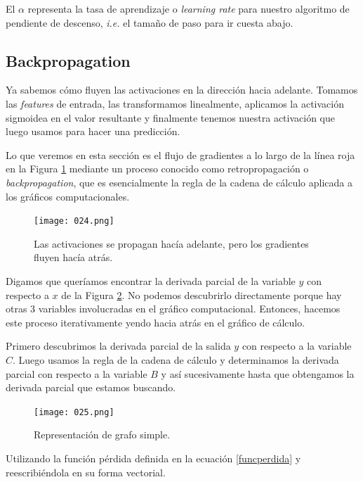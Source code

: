 \documentclass[14.5pt,a4paper]{article}
\begin{document}
El $\alpha$ representa la tasa de aprendizaje o  \textit{learning rate} para nuestro algoritmo de pendiente de descenso, \textit{i.e.}  el tamaño de paso para ir cuesta abajo.

\subsection{Backpropagation}

Ya sabemos cómo fluyen las activaciones en la dirección hacia adelante. Tomamos las \textit{features} de entrada, las transformamos linealmente, aplicamos la activación sigmoidea en el valor resultante y finalmente tenemos nuestra activación que luego usamos para hacer una predicción.

Lo que veremos en esta sección es el flujo de gradientes a lo largo de la línea roja en la Figura \ref{fig:back} mediante un proceso conocido como retropropagación o \textit{backpropagation}, que es esencialmente la regla de la cadena de cálculo aplicada a los gráficos computacionales.

\begin{figure}[H]
	\begin{center}				
	\texttt{[image: 024.png]}
  	\caption{Las activaciones se propagan hacía adelante, pero los gradientes fluyen hacía atrás.}
  	\label{fig:back}
  	\end{center}
\end{figure}

Digamos que queríamos encontrar la derivada parcial de la variable $y$ con respecto a $x$ de la Figura \ref{fig:func}. No podemos descubrirlo directamente porque hay otras 3 variables involucradas en el gráfico computacional. Entonces, hacemos este proceso iterativamente yendo hacia atrás en el gráfico de cálculo.

Primero descubrimos la derivada parcial de la salida $y$ con respecto a la variable $C$. Luego usamos la regla de la cadena de cálculo y determinamos la derivada parcial con respecto a la variable $B$ y así sucesivamente hasta que obtengamos la derivada parcial que estamos buscando.

\begin{figure}[H]
	\begin{center}				
	\texttt{[image: 025.png]}
  	\caption{Representación de grafo simple.}
  	\label{fig:func}
  	\end{center}
\end{figure}

Utilizando la función pérdida definida en la ecuación \ref{funcperdida} y reescribiéndola en su forma vectorial.
\end{document}
